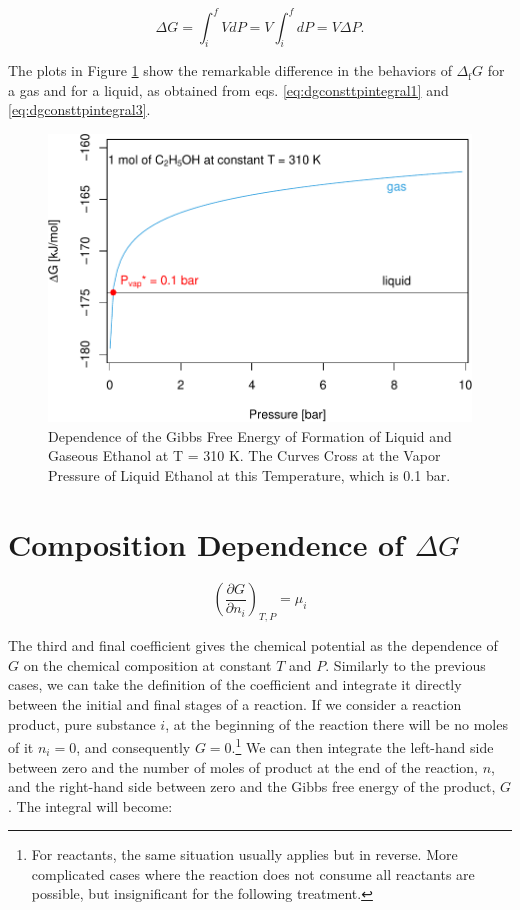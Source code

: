 \documentclass[
  9pt,
]{extbook}
\theoremstyle{definition}
\theoremstyle{definition}
\theoremstyle{definition}
\theoremstyle{remark}
\begin{document}
\begin{equation}
\Delta G = \int_i^f VdP = V \int_i^f dP = V \Delta P.
\label{eq:dgconsttpintegral3}
\end{equation}

The plots in Figure \ref{fig:gdeppfig} show the remarkable difference in the behaviors of \(\Delta_{\text{f}} G\) for a gas and for a liquid, as obtained from eqs. \eqref{eq:dgconsttpintegral1} and \eqref{eq:dgconsttpintegral3}.

\begin{figure}

{\centering \includegraphics{pchem1_files/figure-latex/gdeppfig-1} 

}

\caption{Dependence of the Gibbs Free Energy of Formation of Liquid and Gaseous Ethanol at T = 310 K. The Curves Cross at the Vapor Pressure of Liquid Ethanol at this Temperature, which is 0.1 bar.}\label{fig:gdeppfig}
\end{figure}

\hypertarget{composition-dependence-of-delta-g}{%
\section{\texorpdfstring{Composition Dependence of \(\Delta G\)}{Composition Dependence of \textbackslash Delta G}}\label{composition-dependence-of-delta-g}}

\[
\left(\frac{\partial G}{\partial n_i} \right)_{T,P}=\mu_i
\]

The third and final coefficient gives the chemical potential as the dependence of \(G\) on the chemical composition at constant \(T\) and \(P\). Similarly to the previous cases, we can take the definition of the coefficient and integrate it directly between the initial and final stages of a reaction. If we consider a reaction product, pure substance \(i\), at the beginning of the reaction there will be no moles of it \(n_i=0\), and consequently \(G=0\).\footnote{For reactants, the same situation usually applies but in reverse. More complicated cases where the reaction does not consume all reactants are possible, but insignificant for the following treatment.} We can then integrate the left-hand side between zero and the number of moles of product at the end of the reaction, \(n\), and the right-hand side between zero and the Gibbs free energy of the product, \(G\). The integral will become:
\end{document}
